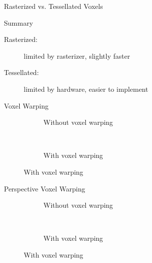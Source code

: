 \documentclass[10pt]{beamer}
\begin{document}
\begin{frame}{Rasterized vs. Tessellated Voxels}
  \begin{block}{Summary}
    \begin{description}
      \item[Rasterized:] limited by rasterizer, slightly faster
      \item[Tessellated:] limited by hardware, easier to implement
    \end{description}
  \end{block}
\end{frame}

\begin{frame}{Voxel Warping}
  \begin{figure}
    \begin{subfigure}[t]{0.475\textwidth}
      \caption*{Without voxel warping}
    \end{subfigure}
    ~
    \begin{subfigure}[t]{0.475\textwidth}
      \caption*{With voxel warping}
    \end{subfigure}
  \end{figure}
\end{frame}

\begin{frame}{Perspective Voxel Warping}
  \begin{figure}
    \begin{subfigure}[t]{0.475\textwidth}
      \caption*{Without voxel warping}
    \end{subfigure}
    ~
    \begin{subfigure}[t]{0.475\textwidth}
      \caption*{With voxel warping}
    \end{subfigure}
  \end{figure}
\end{frame}
\end{document}
